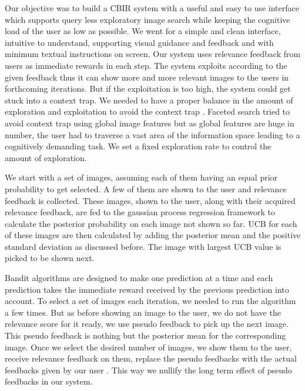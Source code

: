 \documentclass[english]{tktltiki}
\begin{document}
Our objective was to build a CBIR system with a useful and easy to use interface which supports query less exploratory image search \cite{pichunter} \cite{PicSOM} \cite{iter_rel_feed} while keeping the cognitive load of the user as low as possible. We went for a simple and clean interface, intuitive to understand, supporting visual guidance and feedback and with minimum textual instructions on screen. Our system uses relevance feedback from users as immediate rewards in each step. The system exploits according to the given feedback thus it can show more and more relevant images to the users in forthcoming iterations. But if the exploitation is too high, the system could get stuck into a context trap. We needed to have a proper balance in the amount of exploration and exploitation to avoid the context trap \cite{dir_expl_search} \cite{cbir_multinomial_rel_feed} \cite{iter_rel_feed}. Faceted search \cite{faceted_search_1} \cite{faceted_search_2} tried to avoid context trap using global image features but as global features are huge in number, the user had to traverse a vast area of the information space \cite{info_space} leading to a cognitively demanding task. We set a fixed exploration rate to control the amount of exploration.

We start with a set of images, assuming each of them having an equal prior probability to get selected. A few of them are shown to the user and relevance feedback is collected. These images, shown to the user, along with their acquired relevance feedback, are fed to the gaussian process regression framework to calculate the posterior probability on each image not shown so far. UCB for each of these images are then calculated by adding the posterior mean and the positive standard deviation as discussed before. The image with largest UCB value is picked to be shown next.


Bandit algorithms are designed to make one prediction at a time and each prediction takes the immediate reward received by the previous prediction into account. To select a set of images each iteration, we needed to run the algorithm a few times. But as before showing an image to the user, we do not have the relevance score for it ready, we use pseudo feedback to pick up the next image. This pseudo feedback is nothing but the posterior mean for the corresponding image. Once we select the desired number of images, we show them to the user, receive relevance feedback on them, replace the pseudo feedbacks with the actual feedbacks given by our user \cite{imse}. This way we nullify the long term effect of pseudo feedbacks in our system.
\end{document}
